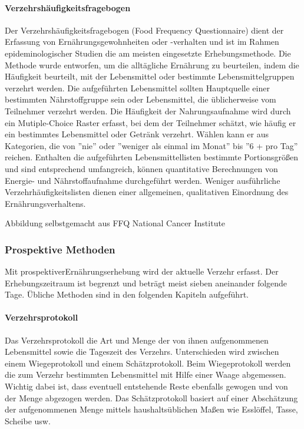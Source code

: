 \paragraph{Verzehrshäufigkeitsfragebogen}

Der Verzehrshäufigkeitsfragebogen (Food Frequency Questionnaire) dient der Erfassung von Ernährungsgewohnheiten oder -verhalten und ist im Rahmen epideminologischer Studien die am meisten eingesetzte Erhebungsmethode. \cite{kirch2006prävention} Die Methode wurde entworfen, um die alltägliche Ernährung zu beurteilen, indem die Häufigkeit beurteilt, mit der Lebensmittel oder bestimmte Lebensmittelgruppen verzehrt werden. Die aufgeführten Lebensmittel sollten Hauptquelle einer bestimmten Nährstoffgruppe sein oder Lebensmittel, die üblicherweise vom Teilnehmer verzehrt werden. Die Häufigkeit der Nahrungsaufnahme wird durch ein Mutiple-Choice Raster erfasst, bei dem der Teilnehmer schätzt, wie häufig er ein bestimmtes Lebensmittel oder Getränk verzehrt. Wählen kann er aus Kategorien, die von ''nie'' oder ''weniger als einmal im Monat'' bis ''6 + pro Tag'' reichen. Enthalten die aufgeführten Lebensmittellisten bestimmte Portionsgrößen und sind entsprechend umfangreich, können quantitative Berechnungen von Energie- und Nährstoffaufnahme durchgeführt werden. Weniger ausführliche Verzehrhäufigkeitslisten dienen einer allgemeinen, qualitativen Einordnung des Ernährungsverhaltens. 

Abbildung selbstgemacht aus FFQ National Cancer Institute

\subsubsection{Prospektive Methoden}

Mit  prospektiverErnährungserhebung wird der aktuelle Verzehr erfasst. Der Erhebungszeitraum ist begrenzt und beträgt meist sieben aneinander folgende Tage. Übliche Methoden  sind in den folgenden Kapiteln aufgeführt. 

\paragraph{Verzehrsprotokoll}

Das Verzehrsprotokoll die Art und Menge der von ihnen aufgenommenen Lebensmittel sowie die Tageszeit des Verzehrs. Unterschieden wird zwischen einem Wiegeprotokoll und einem Schätzprotokoll. Beim Wiegeprotokoll werden die zum Verzehr bestimmten Lebensmittel mit Hilfe einer Waage abgemessen. Wichtig dabei ist, dass eventuell entstehende Reste ebenfalls gewogen und von der Menge abgezogen werden. Das Schätzprotokoll basiert auf einer Abschätzung der aufgenommenen Menge mittels haushaltsüblichen Maßen wie Esslöffel, Tasse, Scheibe usw. 



